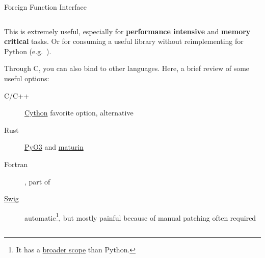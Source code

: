 \documentclass[9pt]{beamer}
\begin{document}
\begin{frame}[fragile]{Foreign Function Interface}
\begin{columns}
\begin{column}{0.5\textwidth}
            This is extremely useful, especially for \textbf{performance
            intensive} and \textbf{memory critical} tasks.
            Or for consuming a useful library without reimplementing for
            Python (e.g.\ \href{https://libgit2.org/}{}).
            \vspace*{20pt}

            Through C, you can also bind to other languages.
            Here, a brief review of some useful options:

            \begin{description}
                \item[C/C++] \href{https://cython.org/}{Cython} favorite
                    option,
                    \href{https://cffi.readthedocs.io/en/latest/overview.html}{}
                    alternative
                \item[Rust] \href{https://pyo3.rs/}{PyO3} and
                  \href{https://maturin.rs}{maturin}
                \item[Fortran]
                    \href{https://numpy.org/doc/stable/f2py/}{},
                    part of 
                \item[\href{https://www.swig.org/}{Swig}] automatic\footnote{
                    It has a
                    \href{https://www.swig.org/compat.html\#SupportedLanguages}{broader
                    scope} than Python.
                  }, but mostly
                  painful because of manual patching often required
            \end{description}
            \vspace*{20pt}
        \end{column}
    \end{columns}
\end{frame}
\end{document}

